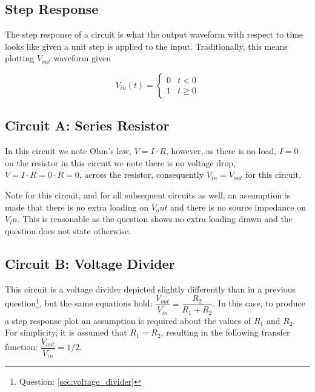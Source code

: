 \documentclass[main.tex]{subfiles}
\begin{document}
\subsection{Step Response}
The step response of a circuit is what the output waveform with respect to time looks like given a unit step is applied to the input. Traditionally, this means plotting $V_{out}$ waveform given 

\[ V_{in}(t) = \begin{cases} 0 & t < 0 \\ 1 & t \geq 0 \end{cases} \]


\subsection{Circuit A: Series Resistor}
In this circuit we note Ohm's law, $V = I \cdot R$, however, as there is no load, $I=0$ on the resistor in this circuit we note there is no voltage drop, $V=I \cdot R=0 \cdot R=0$, across the resistor, consequently $V_{in} = V_{out}$ for this circuit. \newline

\newnoindentpara Note for this circuit, and for all subsequent circuits as well, an assumption is made that there is no extra loading on $V_out$ and there is no source impedance on $V_in$. This is reasonable as the question shows no extra loading drawn and the question does not state otherwise.

\subsection{Circuit B: Voltage Divider}
This circuit is a voltage divider depicted slightly differently than in a previous question\footnote{Question: \ref{sec:voltage_divider}}, but the same equations hold: $\dfrac{V_{out}}{V_{in}} = \dfrac{R_2}{R_1 + R_2}$. In this case, to produce a step response plot an assumption is required about the values of $R_1$ and $R_2$. For simplicity, it is assumed that $R_1 = R_2$, resulting in the following transfer function: $\dfrac{V_{out}}{V_{in}} = 1/2$.
\end{document}
